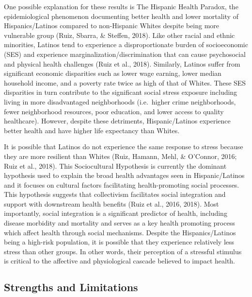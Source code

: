 \documentclass[
  man, fleqn, noextraspace]{apa6}
\begin{document}
One possible explanation for these results is The Hispanic Health Paradox, the epidemiological phenomenon documenting better health and lower mortality of Hispanics/Latinos compared to non-Hispanic Whites despite being more vulnerable group (Ruiz, Sbarra, \& Steffen, 2018). Like other racial and ethnic minorities, Latinos tend to experience a disproportionate burden of socioeconomic (SES) and experience marginalization/discrimination that can cause psychosocial and physical health challenges (Ruiz et al., 2018). Similarly, Latinos suffer from significant economic disparities such as lower wage earning, lower median household income, and a poverty rate twice as high of that of Whites. These SES disparities in turn contribute to the significant social stress exposure including living in more disadvantaged neighborhoods (i.e.~higher crime neighborhoods, fewer neighborhood resources, poor education, and lower access to quality healthcare). However, despite these detriments, Hispanic/Latinos experience better health and have higher life expectancy than Whites.

It is possible that Latinos do not experience the same response to stress because they are more resilient than Whites (Ruiz, Hamann, Mehl, \& O'Connor, 2016; Ruiz et al., 2018). This Sociocultural Hypothesis is currently the dominant hypothesis used to explain the broad health advantages seen in Hispanic/Latinos and it focuses on cultural factors facilitating health-promoting social processes. This hypothesis suggests that collectivism facilitates social integration and support with downstream health benefits (Ruiz et al., 2016, 2018). Most importantly, social integration is a significant predictor of health, including disease morbidity and mortality and serves as a key health promoting process which affect health through social mechanisms. Despite the Hispanics/Latinos being a high-risk population, it is possible that they experience relatively less stress than other groups. In other words, their perception of a stressful stimulus is critical to the affective and physiological cascade believed to impact health.

\hypertarget{strengths-and-limitations}{%
\subsection{Strengths and Limitations}\label{strengths-and-limitations}}
\end{document}
